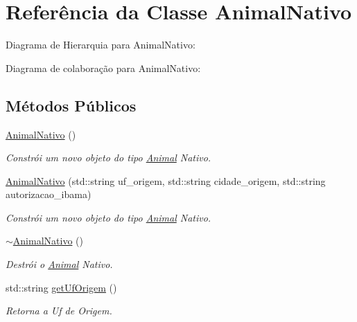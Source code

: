 \hypertarget{classAnimalNativo}{}\section{Referência da Classe Animal\+Nativo}
\label{classAnimalNativo}


Diagrama de Hierarquia para Animal\+Nativo\+:


Diagrama de colaboração para Animal\+Nativo\+:
\subsection*{Métodos Públicos}
\begin{DoxyCompactItemize}
\item 
\mbox{\label{classAnimalNativo_a166ca155fc305b9ae674546988b27f94}} 
\hyperlink{classAnimalNativo_a166ca155fc305b9ae674546988b27f94}{Animal\+Nativo} ()
\begin{DoxyCompactList}\small\item\em Constrói um novo objeto do tipo \hyperlink{classAnimal}{Animal} Nativo. \end{DoxyCompactList}\item 
\hyperlink{classAnimalNativo_aeb63658fc124d85a0804c9dd8e05931b}{Animal\+Nativo} (std\+::string uf\+\_\+origem, std\+::string cidade\+\_\+origem, std\+::string autorizacao\+\_\+ibama)
\begin{DoxyCompactList}\small\item\em Constrói um novo objeto do tipo \hyperlink{classAnimal}{Animal} Nativo. \end{DoxyCompactList}\item 
\mbox{\label{classAnimalNativo_a365f41847e6c472b7c549f0c927929d5}} 
\hyperlink{classAnimalNativo_a365f41847e6c472b7c549f0c927929d5}{$\sim$\+Animal\+Nativo} ()
\begin{DoxyCompactList}\small\item\em Destrói o \hyperlink{classAnimal}{Animal} Nativo. \end{DoxyCompactList}\item 
std\+::string \hyperlink{classAnimalNativo_a4adb947e6542cdb4ac9be98cbe2450d7}{get\+Uf\+Origem} ()
\begin{DoxyCompactList}\small\item\em Retorna a Uf de Origem. \end{DoxyCompactList}\item 

\end{DoxyCompactItemize}
